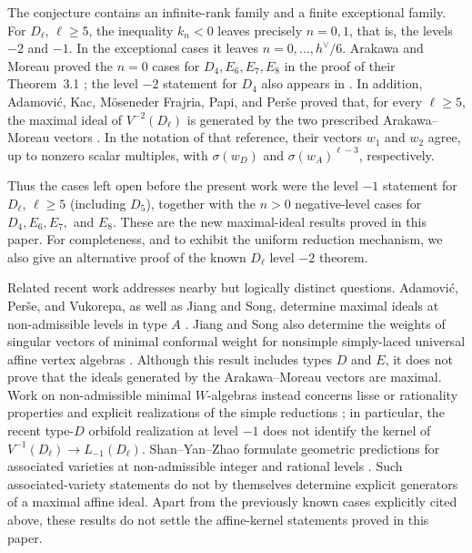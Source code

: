 \documentclass[11pt,reqno]{amsart}
\theoremstyle{definition}
\theoremstyle{remark}
\begin{document}
The conjecture contains an infinite-rank family and a finite exceptional
family.  For $D_\ell$, $\ell\ge5$, the inequality $k_n<0$ leaves precisely
$n=0,1$, that is, the levels $-2$ and $-1$.  In the exceptional cases it
leaves $n=0,\ldots,h^\vee/6$.  Arakawa and Moreau proved the $n=0$ cases
for $D_4,E_6,E_7,E_8$ in the proof of their Theorem~3.1
\cite{ArakawaMoreau2018}; the level $-2$ statement for $D_4$ also appears
in \cite[Theorem~4.2]{Perse2013}.  In addition, Adamovi\'c, Kac,
M\"oseneder Frajria, Papi, and Per\v{s}e proved that, for every
$\ell\ge5$, the maximal ideal of $V^{-2}(D_\ell)$ is generated by the two
prescribed Arakawa--Moreau vectors
\cite[Section~6, especially Corollary~6.6(1)]
{AdamovicKacMosenederFrajriaPapiPerse2020}.
In the notation of that reference, their vectors $w_1$ and $w_2$ agree,
up to nonzero scalar multiples, with
$\sigma(w_D)$ and $\sigma(w_A)^{\ell-3}$, respectively.

Thus the cases left open before the present work were the level $-1$
statement for $D_\ell$, $\ell\ge5$ (including $D_5$), together with the
$n>0$ negative-level cases for $D_4,E_6,E_7,$ and $E_8$.  These are the
new maximal-ideal results proved in this paper.  For completeness, and to
exhibit the uniform reduction mechanism, we also give an alternative proof
of the known $D_\ell$ level $-2$ theorem.

Related recent work addresses nearby but logically distinct questions.
Adamovi\'c, Per\v{s}e, and Vukorepa, as well as Jiang and Song, determine
maximal ideals at non-admissible levels in type $A$
\cite{AdamovicPerseVukorepa2026,JiangSong2025}.  Jiang and Song also
determine the weights of singular vectors of minimal conformal weight for
nonsimple simply-laced universal affine vertex algebras
\cite{JiangSongSingular2025}.  Although this result includes types $D$
and $E$, it does not prove that the ideals generated by the
Arakawa--Moreau vectors are maximal.  Work on non-admissible minimal
$W$-algebras instead concerns lisse or rationality properties and explicit
realizations of the simple reductions
\cite{Kawasetsu2018,ArakawaVanEkeren2023,
	ArakawaCreutzigKawasetsu2025,
	CreutzigFasquelKovalchukLinshawNakatsuka2025}; in particular, the recent
type-$D$ orbifold realization at level $-1$ does not identify the kernel of
$V^{-1}(D_\ell)\to L_{-1}(D_\ell)$.  Shan--Yan--Zhao formulate geometric
predictions for associated varieties at non-admissible integer and rational
levels \cite{ShanYanZhao2025,ShanYanZhao2026}.  Such associated-variety
statements do not by themselves determine explicit generators of a maximal
affine ideal.  Apart from the previously known cases explicitly cited
above, these results do not settle the affine-kernel statements proved in
this paper.
\end{document}
